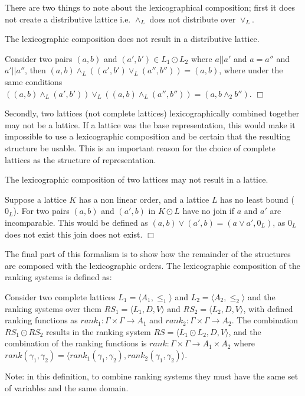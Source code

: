 There are two things to note about the lexicographical composition; 
first it does not create a distributive lattice i.e. $\wedge_L$ does not distribute over $\vee_L$.
\begin{prop}
The lexicographic composition does not result in a distributive lattice.
\end{prop}
\begin{prof}
Consider two pairs $(a,b)$ and $(a', b') \in L_1 \odot L_2$ where $a || a'$ and $a = a''$ and $a' || a''$,
then $(a,b) \wedge_{L} ((a', b') \vee_{L} (a'', b'')) = (a,b)$,
where under the same conditions $((a,b) \wedge_{L} (a', b')) \vee_{L} ((a,b) \wedge_{L} (a'', b'')) = (a,b \wedge_2 b'')$.
$\Box$\end{prof}

Secondly, two lattices (not complete lattices) lexicographically combined together may not be a lattice. 
If a lattice was the base representation, this would make it impossible to use a lexicographic composition and be certain that the resulting structure be usable.
This is an important reason for the choice of complete lattices as the structure of representation.
\begin{prop}
The lexicographic composition of two lattices may not result in a lattice.
\end{prop}
\begin{prof}
Suppose a lattice $K$ has a non linear order, and a lattice $L$ has no least bound ($0_L$). 
For two pairs $(a,b)$ and $(a',b)$ in $K \odot L$ have no join if $a$ and $a'$ are incomparable.
This would be defined as $(a,b) \vee (a',b) = (a \vee a',0_L)$, as $0_L$ does not exist this join does not exist.
$\Box$\end{prof}

The final part of this formalism is to show how the remainder of the structures are composed with the lexicographic orders.
The lexicographic composition of the ranking systems is defined as:
\begin{defs}
Consider two complete lattices $L_1 = \langle A_1, \leq_1 \rangle$ and $L_2 = \langle A_2,\leq_2 \rangle$ and
the ranking systems over them $RS_1 = \langle L_1,D,V \rangle $ and $RS_2 = \langle L_2,D,V \rangle$,
with defined ranking functions as $rank_1: \Gamma \times \Gamma \rightarrow A_1 $ and $rank_2: \Gamma \times \Gamma \rightarrow A_2$.
The combination $RS_1 \odot RS_2$  results in the ranking system 
$RS = \langle L_1 \odot L_2, D, V \rangle$, 
and the combination of the ranking functions is 
$rank: \Gamma \times \Gamma \rightarrow A_1 \times A_2$ where $rank(\gamma_1,\gamma_2) = \langle rank_1(\gamma_1,\gamma_2), rank_2(\gamma_1,\gamma_2) \rangle$.
\end{defs}
Note: in this definition, to combine ranking systems they must have the same set of variables and the same domain.

